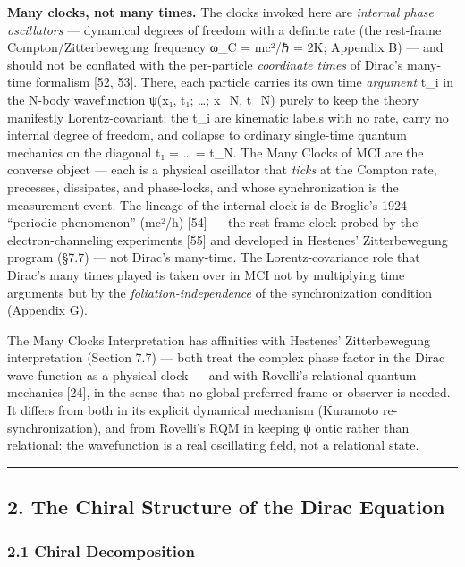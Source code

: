 \documentclass[
]{article}
\begin{document}
\textbf{Many clocks, not many times.} The clocks invoked here are
\emph{internal phase oscillators} --- dynamical degrees of freedom with
a definite rate (the rest-frame Compton/Zitterbewegung frequency ω\_C =
mc²/ℏ = 2K; Appendix B) --- and should not be conflated with the
per-particle \emph{coordinate times} of Dirac's many-time formalism
{[}52, 53{]}. There, each particle carries its own time \emph{argument}
t\_i in the N-body wavefunction ψ(x₁, t₁; \ldots; x\_N, t\_N) purely to
keep the theory manifestly Lorentz-covariant: the t\_i are kinematic
labels with no rate, carry no internal degree of freedom, and collapse
to ordinary single-time quantum mechanics on the diagonal t₁ = \ldots{}
= t\_N. The Many Clocks of MCI are the converse object --- each is a
physical oscillator that \emph{ticks} at the Compton rate, precesses,
dissipates, and phase-locks, and whose synchronization is the
measurement event. The lineage of the internal clock is de Broglie's
1924 ``periodic phenomenon'' (mc²/h) {[}54{]} --- the rest-frame clock
probed by the electron-channeling experiments {[}55{]} and developed in
Hestenes' Zitterbewegung program (§7.7) --- not Dirac's many-time. The
Lorentz-covariance role that Dirac's many times played is taken over in
MCI not by multiplying time arguments but by the
\emph{foliation-independence} of the synchronization condition (Appendix
G).

The Many Clocks Interpretation has affinities with Hestenes'
Zitterbewegung interpretation (Section 7.7) --- both treat the complex
phase factor in the Dirac wave function as a physical clock --- and with
Rovelli's relational quantum mechanics {[}24{]}, in the sense that no
global preferred frame or observer is needed. It differs from both in
its explicit dynamical mechanism (Kuramoto re-synchronization), and from
Rovelli's RQM in keeping ψ ontic rather than relational: the
wavefunction is a real oscillating field, not a relational state.

\begin{center}\rule{0.5\linewidth}{0.5pt}\end{center}

\subsection{2. The Chiral Structure of the Dirac
Equation}\label{the-chiral-structure-of-the-dirac-equation}

\subsubsection{2.1 Chiral Decomposition}\label{chiral-decomposition}
\end{document}
